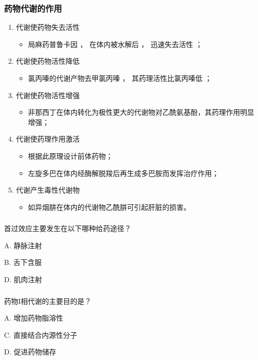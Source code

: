 \documentclass[dvipsnames, svgnames, x11names]{beamer}
\begin{document}
\begin{frame}
    \frametitle{药物代谢的作用}
  \begin{enumerate}
    \item 代谢使药物失去活性
      \begin{itemize}
        \item 局麻药普鲁卡因 ， 在体内被水解后 ， 迅速失去活性 ；
      \end{itemize}
    \item 代谢使药物活性降低
      \begin{itemize}
        \item 氯丙嗪的代谢产物去甲氯丙嗪 ， 其药理活性比氯丙嗪低 ；
      \end{itemize}
    \item 代谢使药物活性增强
      \begin{itemize}
        \item 非那西丁在体内转化为极性更大的代谢物对乙酰氨基酚，其药理作用明显增强；
      \end{itemize}
    \item 代谢使药理作用激活
      \begin{itemize}
        \item 根据此原理设计前体药物；
        \item 左旋多巴在体内经酶解脱羧后再生成多巴胺而发挥治疗作用；
      \end{itemize}
    \item 代谢产生毒性代谢物
      \begin{itemize}
        \item 如异烟肼在体内的代谢物乙酰肼可引起肝脏的损害。
      \end{itemize}
  \end{enumerate}
\end{frame}


\begin{frame}[t]
    \frametitle{}
    \begin{question}
        首过效应主要发生在以下哪种给药途径？
        \tcblower

        A. 静脉注射

        B. 舌下含服


        D. 肌肉注射
    \end{question}
\end{frame}


\begin{frame}[t]
    \frametitle{}
    \begin{question}
        药物I相代谢的主要目的是？
        \tcblower

        A. 增加药物脂溶性


        C. 直接结合内源性分子

        D. 促进药物储存
    \end{question}
\end{frame}
\end{document}
